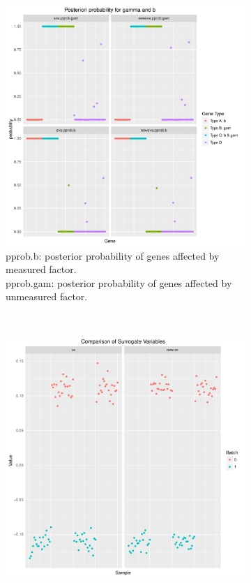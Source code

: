 \documentclass[11pt]{article}
\begin{document}
\begin{figure}[h!]
    \centering
    \begin{subfigure}[t]{0.4\textwidth}
    \centering
    \includegraphics[width = \textwidth]{figures/pprop0.pdf}
    \caption{pprob.b: posterior probability of genes affected by measured factor.\\
    pprob.gam: posterior probability of genes affected by unmeasured factor.}
    \label{fig:pprob2}
    \end{subfigure}
~    
    \begin{subfigure}[t]{0.4\textwidth}
    \centering
    \includegraphics[width = \textwidth]{figures/vector0.pdf}

\end{subfigure}
\end{figure}
\end{document}
